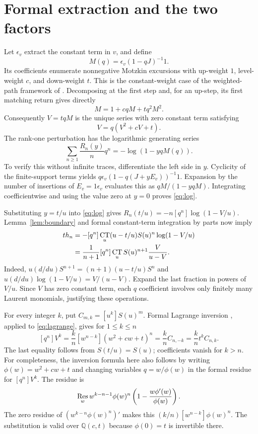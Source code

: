 \documentclass[11pt]{article}
\DeclareMathOperator{\CT}{CT}
\newcommand{\Q}{\mathbb Q}
\begin{document}
\section{Formal extraction and the two factors}
Let $\epsilon_v$ extract the constant term in $v$, and define
\[
 M(q)=\epsilon_v(1-qJ)^{-1}1.
\]
Its coefficients enumerate nonnegative Motzkin excursions with up-weight
$1$, level-weight $c$, and down-weight $t$. This is the constant-weight
case of the weighted-path framework of \cite[Theorem~1]{Flajolet80}.
Decomposing at the first step and, for an up-step, its first matching
return gives directly
\begin{equation}\label{eq:motzkin}
 M=1+cqM+tq^2M^2.
\end{equation}
Consequently $V=tqM$ is the unique series with zero constant term satisfying
\begin{equation}\label{eq:lagrange}
 V=q(V^2+cV+t).
\end{equation}
The rank-one perturbation has the logarithmic generating series
\begin{equation}\label{eq:log}
 \sum_{n\geq1}\frac{R_n(y)}{n}q^n=-\log(1-yqM(q)).
\end{equation}
To verify this without infinite traces, differentiate the left side in
$y$. Cyclicity of the finite-support terms yields
$q\epsilon_v(1-q(J+yE_v))^{-1}1$. Expansion by the number of insertions
of $E_v=1\epsilon_v$ evaluates this as $qM/(1-yqM)$. Integrating
coefficientwise and using the value zero at $y=0$ proves \eqref{eq:log}.

Substituting $y=t/u$ into \eqref{eq:log} gives
$R_n(t/u)=-n[q^n]\log(1-V/u)$. Lemma~\ref{lem:boundary} and formal
constant-term integration by parts now imply
\begin{align}
 t h_n
 &=-[q^n]\CT_u(u-t/u)S(u)^n\log(1-V/u)\notag\\
 &=\frac{1}{n+1}[q^n]\CT_u S(u)^{n+1}\frac{V}{u-V}.
 \label{eq:extract}
\end{align}
Indeed, $u(d/du)S^{n+1}=(n+1)(u-t/u)S^n$ and
$u(d/du)\log(1-V/u)=V/(u-V)$. Expand the last fraction in powers of
$V/u$. Since $V$ has zero constant term, each $q$ coefficient involves
only finitely many Laurent monomials, justifying these operations.

For every integer $k$, put $C_{m,k}=[u^k]S(u)^m$.
Formal Lagrange inversion \cite[Theorem~2.1.1]{Gessel16}, applied to
\eqref{eq:lagrange}, gives for $1\leq k\leq n$
\begin{equation}\label{eq:lagrange-coeff}
 [q^n]V^k=\frac{k}{n}[w^{n-k}](w^2+cw+t)^n
         =\frac{k}{n}C_{n,-k}=\frac{k}{n}t^kC_{n,k}.
\end{equation}
The last equality follows from $S(t/u)=S(u)$; coefficients vanish for
$k>n$. For completeness, the inversion formula here also follows by
writing $\phi(w)=w^2+cw+t$ and changing variables
$q=w/\phi(w)$ in the formal residue for $[q^n]V^k$.
The residue is
\[
 \mathop{\rm Res}_w
 w^{k-n-1}\phi(w)^n\left(1-\frac{w\phi'(w)}{\phi(w)}\right).
\]
The zero residue of $(w^{k-n}\phi(w)^n)'$ makes this
$(k/n)[w^{n-k}]\phi(w)^n$. The substitution is valid over
$\Q(c,t)$ because $\phi(0)=t$ is invertible there.
\end{document}
